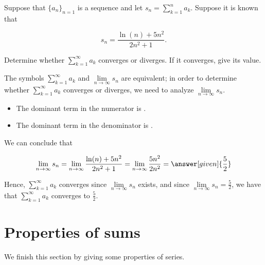 \documentclass{ximera}
\begin{document}
\begin{example}
Suppose that $\{a_n\}_{n=1}$ is a sequence and let $s_n = \sum\limits_{k=1}^n a_k$.  Suppose it is known that

\[
s_n = \frac{\ln(n)+5n^2}{2n^2+1}.
\]

Determine whether $\sum\limits_{k=1}^{\infty} a_k$ converges or diverges.  If it converges, give its value.

\begin{explanation}
The symbols $\sum\limits_{k=1}^{\infty} a_k$ and $\lim\limits_{n \to \infty} s_n$ are equivalent; in order to determine whether $\sum\limits_{k=1}^{\infty} a_k$ converges or diverges, we need to analyze $\lim\limits_{n \to \infty} s_n$.  

\begin{itemize}
\item The dominant term in the numerator is .
\item The dominant term in the denominator is .
\end{itemize}
We can conclude that 

\[ \lim\limits_{n \to \infty} s_n = \lim\limits_{n \to \infty} \frac{\ln(n)+5n^2}{2n^2+1} =  \lim\limits_{n \to \infty} \frac{5n^2}{2n^2} = \answer[given]{\frac{5}{2}}\]

Hence, $\sum\limits_{k=1}^{\infty} a_k$ converges since  $\lim\limits_{n \to \infty} s_n$ exists, and since  $\lim\limits_{n \to \infty} s_n=\frac{5}{2}$, we have that $\sum\limits_{k=1}^{\infty} a_k$ converges to $\frac{5}{2}$.
\end{explanation}

\end{example}














\section{Properties of sums}

We finish this section by giving some properties of series.
\end{document}

